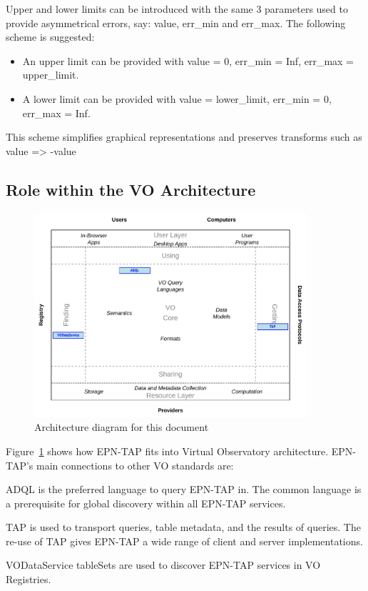 \documentclass[11pt,a4paper]{ivoa}
\begin{document}
\begin{itemize}
Upper and lower limits can be introduced with the same 3 parameters used to provide asymmetrical errors, say: value, err\_min and err\_max. The following scheme is suggested: 

\begin{itemize}
\item An upper limit can be provided with value = 0, err\_min = Inf, err\_max = upper\_limit.

\item A lower limit can be provided with value = lower\_limit, err\_min = 0, err\_max = Inf.
\end{itemize}

This scheme simplifies graphical representations and preserves transforms such as value => -value


\end{itemize}



\subsection{Role within the VO Architecture}

\begin{figure}[thb]
\centering

\includegraphics[width=0.9\textwidth]{role_diagram.pdf}
\caption{Architecture diagram for this document}
\label{fig:archdiag}
\end{figure}


Figure~\ref{fig:archdiag} shows how EPN-TAP fits into Virtual
Observatory architecture.  EPN-TAP's main connections to other VO
standards are:

\begin{bigdescription}
\item[\citet{2008ivoa.spec.1030O}] ADQL is the preferred language to
query EPN-TAP in.  The common language is a prerequisite for global
discovery within all EPN-TAP services.
\item[\citet{2010ivoa.spec.0327D}] TAP is used to transport queries,
table metadata, and the results of queries.  The re-use of TAP gives
EPN-TAP a wide range of client and server implementations.
\item[\citet{2010ivoa.spec.1202P}] VODataService tableSets are used to
discover EPN-TAP services in VO Registries.
\end{bigdescription}
\end{document}
